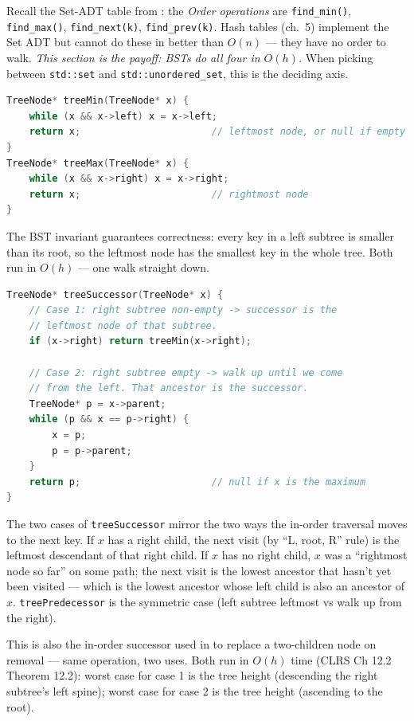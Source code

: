 \documentclass[11pt]{article}
\begin{document}
Recall the Set-ADT table from : the \emph{Order
operations} are \texttt{find\_min()}, \texttt{find\_max()},
\texttt{find\_next(k)}, \texttt{find\_prev(k)}. Hash tables (ch.~5)
implement the Set ADT but cannot do these in better than $O(n)$ ---
they have no order to walk. \emph{This section is the payoff: BSTs
do all four in $O(h)$.} When picking between \texttt{std::set} and
\texttt{std::unordered\_set}, this is the deciding axis.

\begin{examplebox}
\begin{lstlisting}[language=C++,basicstyle=\ttfamily\small,frame=single]
TreeNode* treeMin(TreeNode* x) {
    while (x && x->left) x = x->left;
    return x;                       // leftmost node, or null if empty
}
TreeNode* treeMax(TreeNode* x) {
    while (x && x->right) x = x->right;
    return x;                       // rightmost node
}
\end{lstlisting}
\end{examplebox}

The BST invariant guarantees correctness: every key in a left
subtree is smaller than its root, so the leftmost node has the
smallest key in the whole tree. Both run in $O(h)$ — one walk
straight down.

\begin{examplebox}
\begin{lstlisting}[language=C++,basicstyle=\ttfamily\small,frame=single]
TreeNode* treeSuccessor(TreeNode* x) {
    // Case 1: right subtree non-empty -> successor is the
    // leftmost node of that subtree.
    if (x->right) return treeMin(x->right);

    // Case 2: right subtree empty -> walk up until we come
    // from the left. That ancestor is the successor.
    TreeNode* p = x->parent;
    while (p && x == p->right) {
        x = p;
        p = p->parent;
    }
    return p;                       // null if x is the maximum
}
\end{lstlisting}
\end{examplebox}

\begin{ideabox}
The two cases of \texttt{treeSuccessor} mirror the two ways the
in-order traversal moves to the next key. If $x$ has a right child,
the next visit (by ``L, root, R'' rule) is the leftmost descendant
of that right child. If $x$ has no right child, $x$ was a ``rightmost
node so far'' on some path; the next visit is the lowest ancestor
that hasn't yet been visited --- which is the lowest ancestor whose
left child is also an ancestor of $x$. \texttt{treePredecessor} is
the symmetric case (left subtree leftmost vs walk up from the right).

This is also the in-order successor used in  to
replace a two-children node on removal --- same operation, two
uses. Both run in $O(h)$ time (CLRS Ch 12.2 Theorem 12.2): worst
case for case 1 is the tree height (descending the right subtree's
left spine); worst case for case 2 is the tree height (ascending to
the root).
\end{ideabox}
\end{document}
